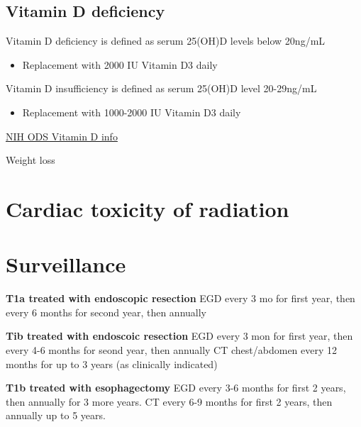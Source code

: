 \documentclass[
]{book}
\providecommand{\tightlist}{%
  \setlength{\itemsep}{0pt}\setlength{\parskip}{0pt}}
\begin{document}
\hypertarget{vitamin-d-deficiency}{%
\subsection{Vitamin D deficiency}\label{vitamin-d-deficiency}}

Vitamin D deficiency is defined as serum 25(OH)D levels below 20ng/mL

\begin{itemize}
\tightlist
\item
  Replacement with 2000 IU Vitamin D3 daily \citep{khan97}
\end{itemize}

Vitamin D insufficiency is defined as serum 25(OH)D level 20-29ng/mL

\begin{itemize}
\tightlist
\item
  Replacement with 1000-2000 IU Vitamin D3 daily
\end{itemize}

\href{https://ods.od.nih.gov/factsheets/vitamind-healthprofessional/}{NIH ODS Vitamin D info}

\citep{baker987}

Weight loss
\citep{martin1308}
\citep{ouattara1088}

\hypertarget{cardiac-toxicity-of-radiation}{%
\section{Cardiac toxicity of radiation}\label{cardiac-toxicity-of-radiation}}

\citep{beukema85} \citep{frandsen516} \citep{gharzaie0158916}

\hypertarget{eso_surveillance}{%
\section{Surveillance}\label{eso_surveillance}}

\textbf{T1a treated with endoscopic resection}
EGD every 3 mo for first year, then every 6 months for second year, then annually\citep{shaheen30}

\textbf{Tib treated with endoscoic resection}
EGD every 3 mon for first year, then every 4-6 months for seond year, then annually
CT chest/abdomen every 12 months for up to 3 years (as clinically indicated)

\textbf{T1b treated with esophagectomy}
EGD every 3-6 months for first 2 years, then annually for 3 more years.
CT every 6-9 months for first 2 years, then annually up to 5 years.
\end{document}
